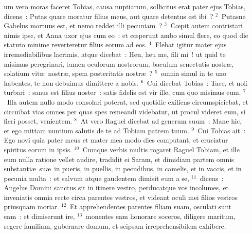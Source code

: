 \bchapter
{}um vero moras faceret Tobias, causa nuptiarum, sollicitus erat pater ejus Tobias, dicens~: Putas quare moratur filius meus, aut quare detentus est ibi~?
${}^{2}$~Putasne Gabelus mortuus est, et nemo reddet illi pecuniam~?
${}^{3}$~Cœpit autem contristari nimis ipse, et Anna uxor ejus cum eo~: et cœperunt ambo simul flere, eo quod die statuto minime reverteretur filius eorum ad eos.
${}^{4}$~Flebat igitur mater ejus irremediabilibus lacrimis, atque dicebat~: Heu, heu me, fili mi~! ut quid te misimus peregrinari, lumen oculorum nostrorum, baculum senectutis nostr\ae , solatium vit\ae\ nostr\ae , spem posteritatis nostr\ae~?
${}^{5}$~omnia simul in te uno habentes, te non debuimus dimittere a nobis.
${}^{6}$~Cui dicebat Tobias~: Tace, et noli turbari~: sanus est filius noster~: satis fidelis est vir ille, cum quo misimus eum.
${}^{7}$~Illa autem nullo modo consolari poterat, sed quotidie exiliens circumspiciebat, et circuibat vias omnes per quas spes remeandi videbatur, ut procul videret eum, si fieri posset, venientem.
${}^{8}$~At vero Raguel dicebat ad generum suum~: Mane hic, et ego mittam nuntium salutis de te ad Tobiam patrem tuum.
${}^{9}$~Cui Tobias ait~: Ego novi quia pater meus et mater mea modo dies computant, et cruciatur spiritus eorum in ipsis.
${}^{10}$~Cumque verbis multis rogaret Raguel Tobiam, et ille eum nulla ratione vellet audire, tradidit ei Saram, et dimidiam partem omnis substanti\ae\ su\ae\ in pueris, in puellis, in pecudibus, in camelis, et in vaccis, et in pecunia multa~: et salvum atque gaudentem dimisit eum a se,
${}^{11}$~dicens~: Angelus Domini sanctus sit in itinere vestro, perducatque vos incolumes, et inveniatis omnia recte circa parentes vestros, et videant oculi mei filios vestros priusquam moriar.
${}^{12}$~Et apprehendentes parentes filiam suam, osculati sunt eam~: et dimiserunt ire,
${}^{13}$~monentes eam honorare soceros, diligere maritum, regere familiam, gubernare domum, et seipsam irreprehensibilem exhibere.

